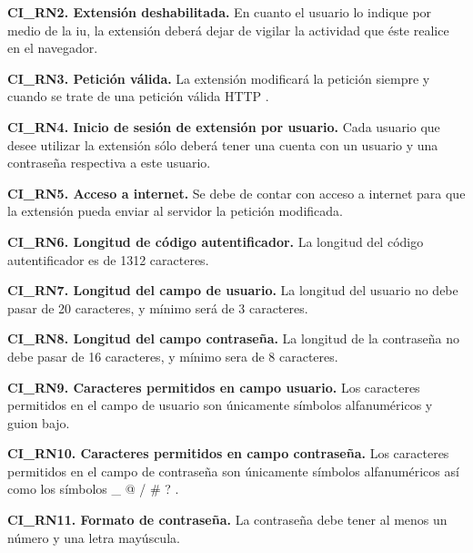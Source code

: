 \documentclass[12pt, a4paper, titlepage]{report}
\begin{document}
			\textbf{CI\_RN2. Extensión deshabilitada.} En cuanto el usuario lo indique por medio de la \acrlong{iu}, la extensión deberá dejar de vigilar la actividad que éste realice en el navegador.\\
			\label{CI_RN2}
			
            \textbf{CI\_RN3. Petición válida.} La extensión modificará la petición siempre y cuando se trate de una petición válida HTTP .\\
            \label{CI_RN3}
            
            \textbf{CI\_RN4. Inicio de sesión de extensión por usuario.} Cada usuario que desee utilizar la extensión sólo deberá tener una cuenta con un usuario y una contraseña respectiva a este usuario. \\
            \label{CI_RN4}
            
            \textbf{CI\_RN5. Acceso a internet.} Se debe de contar con acceso a internet para que la extensión pueda enviar al servidor la petición modificada.\\
            \label{CI_RN5}
				
			\textbf{CI\_RN6. Longitud de código autentificador.} La longitud del código autentificador es de 1312 caracteres.\\
			\label{CI_RN6}
			
			\textbf{CI\_RN7. Longitud del campo de usuario.} La longitud del usuario no debe pasar de 20 caracteres, y mínimo será de 3 caracteres.\\
			\label{CI_RN7}
			
			\textbf{CI\_RN8. Longitud del campo contraseña.}
			La longitud de la contraseña no debe pasar de 16 caracteres, y mínimo sera de 8 caracteres.\\
			\label{CI_RN8}
			
			\textbf{CI\_RN9. Caracteres permitidos en campo usuario.} Los caracteres permitidos en el campo de usuario son únicamente símbolos alfanuméricos y guion bajo.\\
			\label{CI_RN9}
			
			\textbf{CI\_RN10. Caracteres permitidos en campo contraseña.} Los caracteres permitidos en el campo de contraseña son únicamente símbolos alfanuméricos así como los s\'imbolos \_ @ / \# ? .\\
			\label{CI_RN10}
			
			\textbf{CI\_RN11. Formato de contraseña.} La contraseña debe tener al menos un número y una letra mayúscula.\\
			\label{CI_RN11}
			
\end{document}
